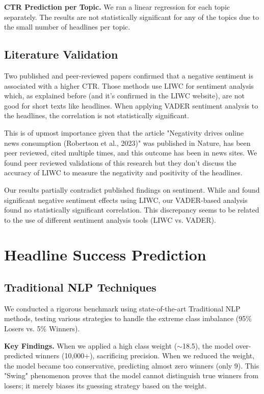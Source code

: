 \documentclass[11pt]{article}
\begin{document}
\textbf{CTR Prediction per Topic.} We ran a linear regression for each topic separately. The results are not statistically significant for any of the topics due to the small number of headlines per topic.

\subsection{Literature Validation}

Two published and peer-reviewed papers confirmed that a negative sentiment is associated with a higher CTR. Those methods use LIWC for sentiment analysis which, as explained before (and it's confirmed in the LIWC website), are not good for short texts like headlines. When applying VADER sentiment analysis to the headlines, the correlation is not statistically significant.

This is of upmost importance given that the article "Negativity drives online news consumption (Robertson et al., 2023)" was published in Nature, has been peer reviewed, cited multiple times, and this outcome has been in news sites. We found peer reviewed validations of this research but they don't discuss the accuracy of LIWC to measure the negativity and positivity of the headlines.

Our results partially contradict published findings on sentiment. While \citet{robertson2023negativity} and \citet{munger2023linguistic} found significant negative sentiment effects using LIWC, our VADER-based analysis found no statistically significant correlation. This discrepancy seems to be related to the use of different sentiment analysis tools (LIWC vs. VADER).

\section{Headline Success Prediction}

\subsection{Traditional NLP Techniques}

We conducted a rigorous benchmark using state-of-the-art Traditional NLP methods, testing various strategies to handle the extreme class imbalance (95\% Losers vs. 5\% Winners).

\textbf{Key Findings.} When we applied a high class weight ($\sim$18.5), the model over-predicted winners (10,000+), sacrificing precision. When we reduced the weight, the model became too conservative, predicting almost zero winners (only 9). This "Swing" phenomenon proves that the model cannot distinguish true winners from losers; it merely biases its guessing strategy based on the weight.
\end{document}
